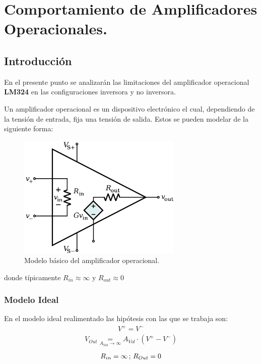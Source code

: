 

\newcommand\underrel[2]{\mathrel{\mathop{#2}\limits_{#1}}}

\usepackage{circuitikz}
\usepackage{xcolor}
\usepackage{amsmath}




\section{Comportamiento de Amplificadores Operacionales.}

\subsection{Introducción}
En el presente punto se analizarán las limitaciones del amplificador operacional \textbf{LM324} en las configuraciones inversora y no inversora.

Un amplificador operacional es un dispositivo electrónico el cual, dependiendo de la tensión de entrada, fija una tensión de salida. Estos se pueden modelar de la siguiente forma:
\begin{figure}[H]	
	\centering
	\includegraphics[width=0.7\textwidth]{Ejercicio1/Imagenes/Basicopamp.png}
	\caption{Modelo básico del amplificador operacional.}
	\label{fig:Basicopamp}
\end{figure}
donde típicamente $R_{in}\approx \infty$ y $R_{out} \approx 0$

\subsubsection{Modelo Ideal}
En el modelo ideal realimentado las hipótesis con las que se trabaja son:
\begin{align} V^+ = V^- \end{align}
\begin{align}V_{Out} \underrel{A_{Vol}\to \infty}{=} A_{Vol} \cdot (V^+ - V^-) \end{align}
\begin{align} R_{in}=\infty   \thinspace;\thinspace R_{Out} = 0 \end{align}

